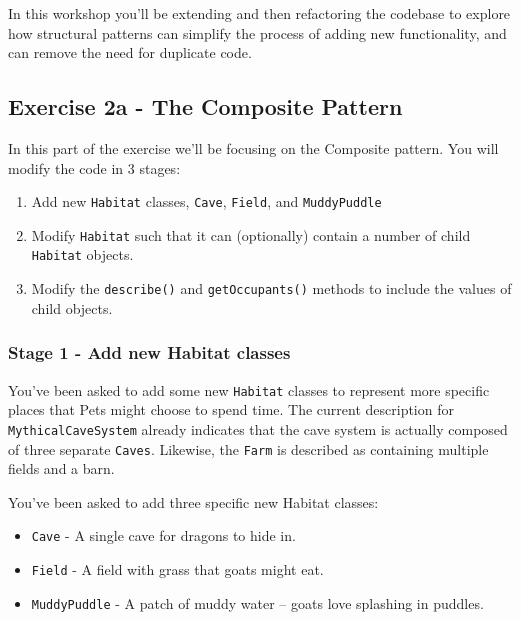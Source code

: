 \documentclass[
]{book}
\providecommand{\tightlist}{%
  \setlength{\itemsep}{0pt}\setlength{\parskip}{0pt}}
\begin{document}
In this workshop you'll be extending and then refactoring the codebase to explore how structural patterns can simplify the process of adding new functionality, and can remove the need for duplicate code.

\hypertarget{composite}{%
\subsection{Exercise 2a - The Composite Pattern}\label{composite}}

In this part of the exercise we'll be focusing on the Composite pattern. You will modify the code in 3 stages:

\begin{enumerate}
\def\labelenumi{\arabic{enumi}.}
\tightlist
\item
  Add new \texttt{Habitat} classes, \texttt{Cave}, \texttt{Field}, and \texttt{MuddyPuddle}
\item
  Modify \texttt{Habitat} such that it can (optionally) contain a number of child \texttt{Habitat} objects.
\item
  Modify the \texttt{describe()} and \texttt{getOccupants()} methods to include the values of child objects.
\end{enumerate}

\hypertarget{habitats}{%
\subsubsection{Stage 1 - Add new Habitat classes}\label{habitats}}

You've been asked to add some new \texttt{Habitat} classes to represent more specific places that Pets might choose to spend time.
The current description for \texttt{MythicalCaveSystem} already indicates that the cave system is actually composed of three separate \texttt{Caves}.
Likewise, the \texttt{Farm} is described as containing multiple fields and a barn.

You've been asked to add three specific new Habitat classes:

\begin{itemize}
\tightlist
\item
  \texttt{Cave} - A single cave for dragons to hide in.
\item
  \texttt{Field} - A field with grass that goats might eat.
\item
  \texttt{MuddyPuddle} - A patch of muddy water -- goats love splashing in puddles.
\end{itemize}
\end{document}
